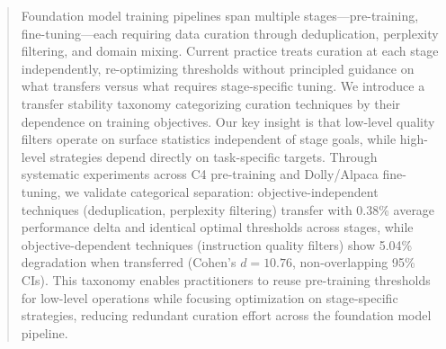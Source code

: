 \begin{abstract}
Foundation model training pipelines span multiple stages—pre-training, fine-tuning—each requiring data curation through deduplication, perplexity filtering, and domain mixing. Current practice treats curation at each stage independently, re-optimizing thresholds without principled guidance on what transfers versus what requires stage-specific tuning. We introduce a transfer stability taxonomy categorizing curation techniques by their dependence on training objectives. Our key insight is that low-level quality filters operate on surface statistics independent of stage goals, while high-level strategies depend directly on task-specific targets. Through systematic experiments across C4 pre-training and Dolly/Alpaca fine-tuning, we validate categorical separation: objective-independent techniques (deduplication, perplexity filtering) transfer with 0.38\% average performance delta and identical optimal thresholds across stages, while objective-dependent techniques (instruction quality filters) show 5.04\% degradation when transferred (Cohen's $d=10.76$, non-overlapping 95\% CIs). This taxonomy enables practitioners to reuse pre-training thresholds for low-level operations while focusing optimization on stage-specific strategies, reducing redundant curation effort across the foundation model pipeline.
\end{abstract}
